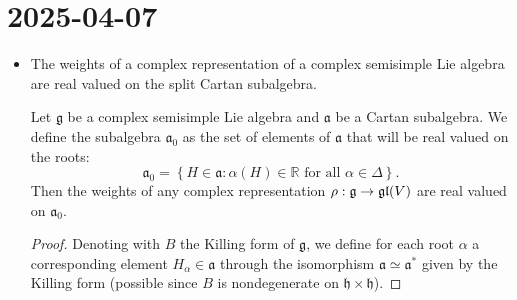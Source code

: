 \documentclass{report}
\begin{document}
\section{2025-04-07}
\begin{itemize}
    \item The weights of a complex representation of a complex semisimple Lie algebra are real valued on the split Cartan subalgebra.
    \begin{lemma}
        Let $\mathfrak g$ be a complex semisimple Lie algebra and $\mathfrak a$ be a Cartan subalgebra.
        We define the subalgebra $\mathfrak a_0$ as the set of elements of $\mathfrak a$ that will be real valued on the roots:
        \[
        \mathfrak a_0 = \left\{ H \in \mathfrak a : \alpha(H) \in \mathbb R \text{ for all } \alpha \in \Delta \right\}.
        \]
        Then the weights of any complex representation $\rho: \mathfrak g \to \operatorname{{\mathfrak{gl}}}(V)$ are real valued on $\mathfrak a_0$.
    \end{lemma}
    \begin{proof}
        Denoting with $B$ the Killing form of $\mathfrak g$, we define for each root $\alpha$ a corresponding element $H_\alpha \in \mathfrak a$ through the isomorphism $\mathfrak a \simeq \mathfrak a^*$ given by the Killing form (possible since $B$ is nondegenerate on $\mathfrak h \times \mathfrak h$).
        

\end{proof}
\end{itemize}
\end{document}
